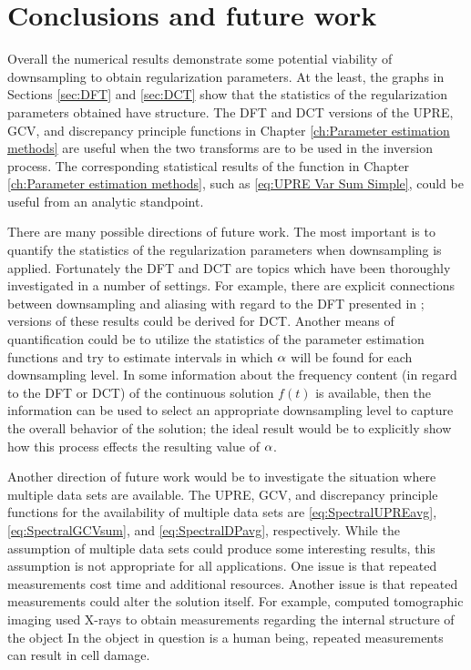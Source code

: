 \chapter{Conclusions and future work} \label{ch:Conclusion}
Overall the numerical results demonstrate some potential viability of downsampling to obtain regularization parameters. At the least, the graphs in Sections \ref{sec:DFT} and \ref{sec:DCT} show that the statistics of the regularization parameters obtained have structure. The DFT and DCT versions of the UPRE, GCV, and discrepancy principle functions in Chapter \ref{ch:Parameter estimation methods} are useful when the two transforms are to be used in the inversion process. The corresponding statistical results of the function in Chapter \ref{ch:Parameter estimation methods}, such as \eqref{eq:UPRE Var Sum Simple}, could be useful from an analytic standpoint. \par 
There are many possible directions of future work. The most important is to quantify the statistics of the regularization parameters when downsampling is applied. Fortunately the DFT and DCT are topics which have been thoroughly investigated in a number of settings. For example, there are explicit connections between downsampling and aliasing with regard to the DFT presented in \cite[Ch.~7]{AudioDFT}; versions of these results could be derived for DCT.  Another means of quantification could be to utilize the statistics of the parameter estimation functions and try to estimate intervals in which $\alpha$ will be found for each downsampling level. In some information about the frequency content (in regard to the DFT or DCT) of the continuous solution $f(t)$ is available, then the information can be used to select an appropriate downsampling level to capture the overall behavior of the solution; the ideal result would be to explicitly show how this process effects the resulting value of $\alpha$. \par 
Another direction of future work would be to investigate the situation where multiple data sets are available. The UPRE, GCV, and discrepancy principle functions for the availability of multiple data sets are \eqref{eq:SpectralUPREavg}, \eqref{eq:SpectralGCVsum}, and \eqref{eq:SpectralDPavg}, respectively. While the assumption of multiple data sets could produce some interesting results, this assumption is not appropriate for all applications. One issue is that repeated measurements cost time and additional resources. Another issue is that repeated measurements could alter the solution itself. For example, computed tomographic imaging used X-rays to obtain measurements regarding the internal structure of the object \cite[p.~12-14]{ABT} In the object in question is a human being, repeated measurements can result in cell damage. \par 

